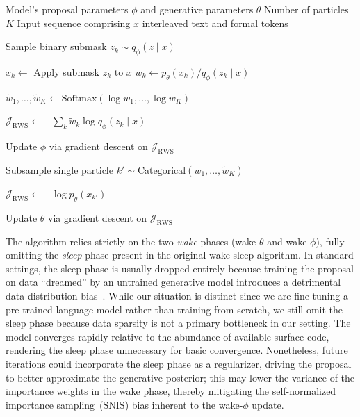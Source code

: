 \documentclass[11pt]{article}
\theoremstyle{plain}
\theoremstyle{definition}
\begin{document}
\begin{algorithm}[ht]
  \caption{Reweighted Wake-Sleep~(RWS) Training Step}\label{alg:rws}
  \begin{algorithmic}[1]
    \Require Model's proposal parameters \( \phi \) and generative
    parameters \( \theta \)
    \Require Number of particles \( K \)
    \Require Input sequence comprising \( x \) interleaved text and
    formal tokens

    \Statex

    \State Sample binary submask \( z_k \sim q_\phi(z \mid x) \)

    \State \( x_k \gets \) Apply submask \( z_k \) to \( x \)
    \State \( w_k \gets p_\theta(x_k) /  q_\phi(z_k \mid x) \)
    \EndFor

    \Statex

    \State \( \tilde{w}_1, \dots, \tilde{w}_K \gets \text{Softmax}(\log
    w_1, \dots, \log w_K) \)

    \Statex

    \State \( \mathcal{J}_{\text{RWS}} \gets - \sum_{k} \tilde{w}_k
    \log q_\phi(z_k \mid x) \)

    \State Update \( \phi \) via gradient descent on
    \(\mathcal{J}_{\text{RWS}} \)

    \Statex

    \State Subsample single particle \( k' \sim
    \text{Categorical}(\tilde{w}_1, \dots, \tilde{w}_K) \)

    \State \( \mathcal{J}_{\text{RWS}} \gets - \log p_\theta(x_{k'}) \)

    \State Update \( \theta \) via gradient descent on
    \(\mathcal{J}_{\text{RWS}} \)
  \end{algorithmic}
\end{algorithm}

The algorithm relies strictly on the two \emph{wake} phases (wake-\(\theta\) and
wake-\(\phi\)), fully omitting the \emph{sleep} phase present in the original
wake-sleep algorithm. In standard settings, the sleep phase is usually dropped
entirely because training the proposal on data ``dreamed'' by an untrained
generative model introduces a detrimental data distribution
bias~\cite{revisiting-rws-2019}. While our situation is distinct since we are
fine-tuning a pre-trained language model rather than training from scratch, we
still omit the sleep phase because data sparsity is not a primary bottleneck in
our setting. The model converges rapidly relative to the abundance of available
surface code, rendering the sleep phase unnecessary for basic convergence.
Nonetheless, future iterations could incorporate the sleep phase as a
regularizer, driving the proposal to better approximate the generative
posterior; this may lower the variance of the importance weights in the wake
phase, thereby mitigating the self-normalized importance sampling~(SNIS) bias
inherent to the wake-\(\phi\) update.
\end{document}

